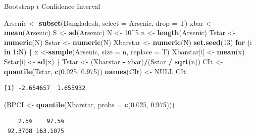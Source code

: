 \documentclass[
  ignorenonframetext,
]{beamer}
\newenvironment{Shaded}{\begin{snugshade}}{\end{snugshade}}
\newcommand{\AttributeTok}[1]{\textcolor[rgb]{0.13,0.29,0.53}{#1}}
\newcommand{\ConstantTok}[1]{\textcolor[rgb]{0.56,0.35,0.01}{#1}}
\newcommand{\ControlFlowTok}[1]{\textcolor[rgb]{0.13,0.29,0.53}{\textbf{#1}}}
\newcommand{\DecValTok}[1]{\textcolor[rgb]{0.00,0.00,0.81}{#1}}
\newcommand{\FloatTok}[1]{\textcolor[rgb]{0.00,0.00,0.81}{#1}}
\newcommand{\FunctionTok}[1]{\textcolor[rgb]{0.13,0.29,0.53}{\textbf{#1}}}
\newcommand{\NormalTok}[1]{#1}
\newcommand{\OtherTok}[1]{\textcolor[rgb]{0.56,0.35,0.01}{#1}}
\newcommand{\SpecialCharTok}[1]{\textcolor[rgb]{0.81,0.36,0.00}{\textbf{#1}}}
\begin{document}
\begin{frame}[fragile]{Bootstrap \(t\) Confidence Interval}
\label{bootstrap-t-confidence-interval-4}
\tiny

\begin{Shaded}
\begin{Highlighting}[]
\NormalTok{Arsenic }\OtherTok{\textless{}{-}} \FunctionTok{subset}\NormalTok{(Bangladesh, }\AttributeTok{select =}\NormalTok{ Arsenic, }\AttributeTok{drop =}\NormalTok{ T)}
\NormalTok{xbar }\OtherTok{\textless{}{-}} \FunctionTok{mean}\NormalTok{(Arsenic)}
\NormalTok{S }\OtherTok{\textless{}{-}} \FunctionTok{sd}\NormalTok{(Arsenic)}
\NormalTok{N }\OtherTok{\textless{}{-}} \DecValTok{10}\SpecialCharTok{\^{}}\DecValTok{5}
\NormalTok{n }\OtherTok{\textless{}{-}} \FunctionTok{length}\NormalTok{(Arsenic)}
\NormalTok{Tstar }\OtherTok{\textless{}{-}} \FunctionTok{numeric}\NormalTok{(N)}
\NormalTok{Sstar }\OtherTok{\textless{}{-}} \FunctionTok{numeric}\NormalTok{(N)}
\NormalTok{Xbarstar }\OtherTok{\textless{}{-}} \FunctionTok{numeric}\NormalTok{(N)}
\FunctionTok{set.seed}\NormalTok{(}\DecValTok{13}\NormalTok{)}
\ControlFlowTok{for}\NormalTok{ (i }\ControlFlowTok{in} \DecValTok{1}\SpecialCharTok{:}\NormalTok{N)}
\NormalTok{\{}
\NormalTok{  x }\OtherTok{\textless{}{-}}\FunctionTok{sample}\NormalTok{(Arsenic, }\AttributeTok{size =}\NormalTok{ n, }\AttributeTok{replace =}\NormalTok{ T)}
\NormalTok{  Xbarstar[i] }\OtherTok{\textless{}{-}} \FunctionTok{mean}\NormalTok{(x)}
\NormalTok{  Sstar[i] }\OtherTok{\textless{}{-}} \FunctionTok{sd}\NormalTok{(x)}
\NormalTok{\}}
\NormalTok{Tstar }\OtherTok{\textless{}{-}}\NormalTok{ (Xbarstar }\SpecialCharTok{{-}}\NormalTok{ xbar)}\SpecialCharTok{/}\NormalTok{(Sstar }\SpecialCharTok{/} \FunctionTok{sqrt}\NormalTok{(n))}
\NormalTok{CIt }\OtherTok{\textless{}{-}} \FunctionTok{quantile}\NormalTok{(Tstar, }\FunctionTok{c}\NormalTok{(}\FloatTok{0.025}\NormalTok{, }\FloatTok{0.975}\NormalTok{))}
\FunctionTok{names}\NormalTok{(CIt) }\OtherTok{\textless{}{-}} \ConstantTok{NULL}
\NormalTok{CIt}
\end{Highlighting}
\end{Shaded}

\begin{verbatim}
[1] -2.654657  1.655932
\end{verbatim}

\begin{Shaded}
\begin{Highlighting}[]
\NormalTok{(BPCI }\OtherTok{\textless{}{-}} \FunctionTok{quantile}\NormalTok{(Xbarstar, }\AttributeTok{probs =} \FunctionTok{c}\NormalTok{(}\FloatTok{0.025}\NormalTok{, }\FloatTok{0.975}\NormalTok{)))}
\end{Highlighting}
\end{Shaded}

\begin{verbatim}
    2.5%    97.5% 
 92.3708 163.1075 
\end{verbatim}

\normalsize
\end{frame}
\end{document}
